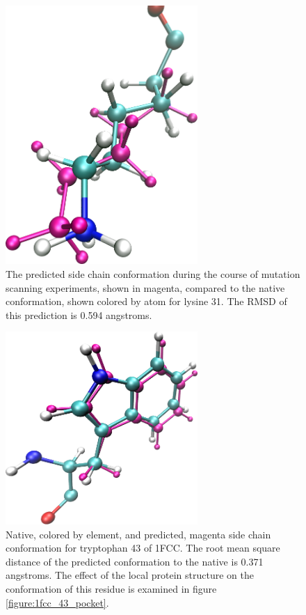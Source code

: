 \begin{figure}[h]
  \centering
  \includegraphics[width=0.65\textwidth,height=0.3\textheight,keepaspectratio]{figures/mutation_side_chain_images/1fcc_31.png}
  \caption{The predicted side chain conformation during the course of mutation scanning experiments, shown in magenta, compared to the native conformation, shown colored by atom for lysine 31.
The RMSD of this prediction is 0.594 angstroms.}
  \label{figure:computational_mutation_scanning/1FCC_31}
\end{figure}

\begin{figure}[h]
  \centering
  \includegraphics[width=0.65\textwidth,height=0.3\textheight,keepaspectratio]{figures/mutation_side_chain_images/1fcc_43.png}
  \caption{Native, colored by element, and predicted, magenta side chain conformation for tryptophan 43 of 1FCC.
The root mean square distance of the predicted conformation to the native is 0.371 angstroms.
The effect of the local protein structure on the conformation of this residue is examined in figure \protect\ref{figure:1fcc_43_pocket}.}
  \label{figure:computational_mutation_scanning/1FCC_43}
\end{figure}

